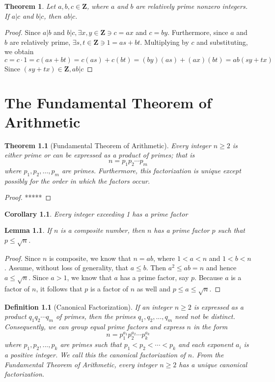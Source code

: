 \documentclass[10pt]{report}
\newtheorem{thm1}{Theorem}[chapter]
\newtheorem{cor1}{Corollary}[chapter]
\newtheorem{lem1}{Lemma}[chapter]
\newtheorem{def1}{Definition}[chapter]
\begin{document}
\begin{thm1}
Let $a, b, c\in \textbf{Z}$, where $a$ and $b$ are relatively prime nonzero integers. If $a|c$ and $b|c$, then $ab|c$.
\end{thm1}
\begin{proof}
Since $a|b$ and $b|c, \exists x,y\in \textbf{Z}\ni c=ax$ and $c=by$. Furthermore, since $a$ and $b$ are relatively prime, $\exists s,t\in \textbf{Z} \ni 1=as+bt$. Multiplying by $c$ and substituting, we obtain
$$c = c\cdot 1 = c(as+bt) = c(as)+c(bt) = (by)(as)+(ax)(bt) = ab(sy+tx)$$ 
Since $(sy+tx)\in \textbf{Z}, ab|c$
\end{proof}

\chapter{The Fundamental Theorem of Arithmetic}
\begin{thm1}[Fundamental Theorem of Arithmetic]
Every integer $n\geq 2$ is either prime or can be expressed as a product of primes; that is
$$n=p_1p_2\cdots p_m$$
where $p_1,p_2,\dots ,p_m$ are primes. Furthermore, this factorization is unique except possibly for the order in which the factors occur.
\end{thm1}
\begin{proof}
*****
\end{proof}
\begin{cor1}
Every integer exceeding 1 has a prime factor
\end{cor1}
\begin{lem1}
If $n$ is a composite number, then $n$ has a prime factor $p$ such that $p\leq \sqrt{n}$.
\end{lem1}
\begin{proof}
Since $n$ is composite, we know that $n=ab$, where $1<a<n$ and $1<b<n$. Assume, without loss of generality, that $a\leq b$. Then $a^2\leq ab=n$ and hence $a\leq\sqrt{n}$. Since $a>1$, we know that $a$ has a prime factor, say $p$. Because $a$ is a factor of $n$, it follows that $p$ is a factor of $n$ as well and $p\leq a \leq \sqrt{n}$.
\end{proof}
\begin{def1}[Canonical Factorization]
If an integer $n\geq 2$ is expressed as a product $q_1q_2\cdots q_m$ of primes, then the primes $q_1,q_2,...,q_m$ need not be distinct. Consequently, we can group equal prime factors and express $n$ in the form
$$n = p_1^{a_1}p_2^{a_2}\cdots p_k^{a_k}$$
where $p_1,p_2,...,p_k$ are primes such that $p_1<p_2<\cdots <p_k$ and each exponent $a_i$ is a positive integer. We call this the canonical factorization of $n$. From the Fundamental Theorem of Arithmetic, every integer $n\geq 2$ has a unique canonical factorization.
\end{def1}
\end{document}
